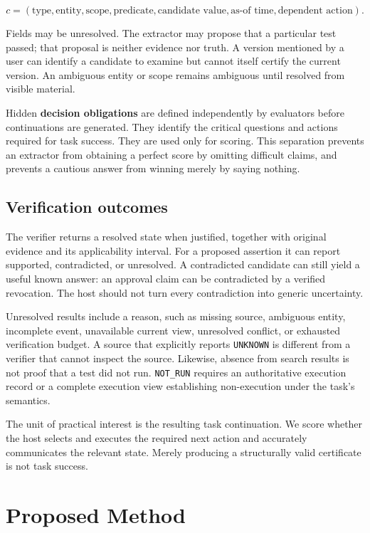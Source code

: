 \[
c=(\text{type},\text{entity},\text{scope},\text{predicate},
\text{candidate value},\text{as-of time},\text{dependent action}).
\]

Fields may be unresolved. The extractor may propose that a particular
test passed; that proposal is neither evidence nor truth. A version
mentioned by a user can identify a candidate to examine but cannot
itself certify the current version. An ambiguous entity or scope remains
ambiguous until resolved from visible material.

Hidden \textbf{decision obligations} are defined independently by
evaluators before continuations are generated. They identify the
critical questions and actions required for task success. They are used
only for scoring. This separation prevents an extractor from obtaining a
perfect score by omitting difficult claims, and prevents a cautious
answer from winning merely by saying nothing.

\subsection{Verification outcomes}\label{verification-outcomes}

The verifier returns a resolved state when justified, together with
original evidence and its applicability interval. For a proposed
assertion it can report supported, contradicted, or unresolved. A
contradicted candidate can still yield a useful known answer: an
approval claim can be contradicted by a verified revocation. The host
should not turn every contradiction into generic uncertainty.

Unresolved results include a reason, such as missing source, ambiguous
entity, incomplete event, unavailable current view, unresolved conflict,
or exhausted verification budget. A source that explicitly reports
\texttt{UNKNOWN} is different from a verifier that cannot inspect the
source. Likewise, absence from search results is not proof that a test
did not run. \texttt{NOT\_RUN} requires an authoritative execution
record or a complete execution view establishing non-execution under the
task's semantics.

The unit of practical interest is the resulting task continuation. We
score whether the host selects and executes the required next action and
accurately communicates the relevant state. Merely producing a
structurally valid certificate is not task success.

\section{Proposed Method}\label{proposed-method}

